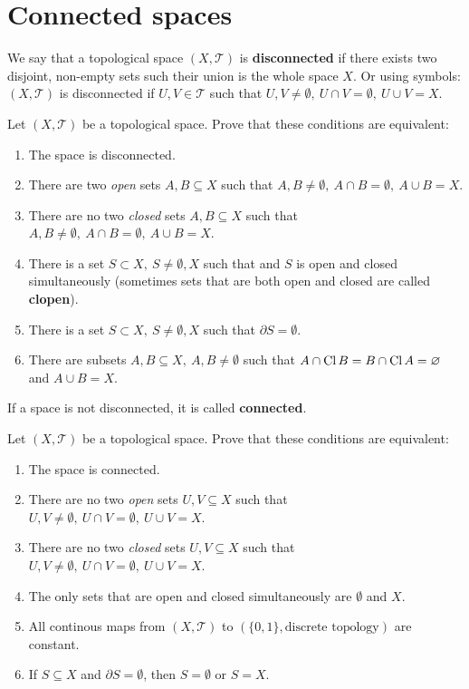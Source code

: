 \section{Connected spaces}
We say that a topological space $(X, \mathcal T)$ is \textbf{disconnected} if there exists two disjoint, non-empty sets such their union is the whole space $X$. Or using symbols:
$(X, \mathcal T)$ is disconnected if $U,V\in \mathcal T$ such that $U,V\neq \emptyset,~U\cap V =\emptyset,~U\cup V=X$.
\begin{prob}
  Let $(X, \mathcal T)$ be a topological space. Prove that these conditions are equivalent:
  \begin{enumerate}
    \item The space is disconnected.
    \item There are two \textit{open} sets $A,B\subseteq X$ such that $A,B\neq \emptyset,~A\cap B=\emptyset,~A\cup B=X$.
    \item There are no two \textit{closed} sets $A,B\subseteq X$ such that $A,B\neq \emptyset,~A\cap B=\emptyset,~A\cup B=X$.
    \item There is a set $S\subset X,~S\neq \emptyset, X$ such that and $S$ is open and closed simultaneously (sometimes sets that are both open and closed are called
    \textbf{clopen}).
    \item There is a set $S\subset X,~S\neq \emptyset, X$ such that $\partial S=\emptyset$.
    \item There are subsets $A,B\subseteq X,~ A,B\neq \emptyset$ such that $A\cap \text{Cl\,} B = B\cap \text{Cl\,} A=\varnothing$ and $A\cup B=X$.
  \end{enumerate}
\end{prob}

If a space is not disconnected, it is called \textbf{connected}.

\begin{prob}
  Let $(X, \mathcal T)$ be a topological space. Prove that these conditions are equivalent:
  \begin{enumerate}
    \item The space is connected.
    \item There are no two \textit{open} sets $U,V\subseteq X$ such that $U,V\neq \emptyset,~U\cap V=\emptyset,~U\cup V=X$.
    \item There are no two \textit{closed} sets $U,V\subseteq X$ such that $U,V\neq \emptyset,~U\cap V=\emptyset,~U\cup V=X$.
    \item The only sets that are open and closed simultaneously are $\emptyset$ and $X$.
    \item All continous maps from $(X, \mathcal T)$ to $(\{0,1\}, \text{discrete topology})$ are constant.
    \item If $S\subseteq X$ and $\partial S=\emptyset$, then $S=\emptyset$ or $S=X$.
  \end{enumerate}
\end{prob}
